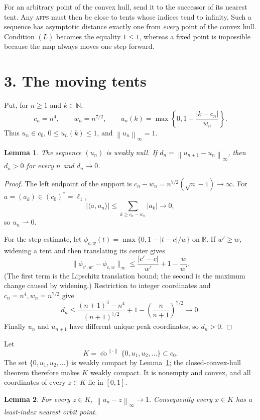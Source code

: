 \documentclass[10pt]{article}
\newtheorem{lemma}{Lemma}
\newcommand{\N}{\mathbb N}
\newcommand{\R}{\mathbb R}
\newcommand{\norm}[1]{\left\lVert #1\right\rVert_\infty}
\newcommand{\co}{\operatorname{co}}
\newcommand{\afps}{\textnormal{\textsc{afps}}\xspace}
\begin{document}
For an arbitrary point of the convex hull, send it to the successor of its
nearest tent.  Any \afps must then be close to tents whose indices tend to
infinity.  Such a sequence has asymptotic distance exactly one from
\emph{every} point of the convex hull.  Condition $(L)$ becomes the equality
$1\leq1$, whereas a fixed point is impossible because the map always moves
one step forward.

\section*{3. The moving tents}

Put, for $n\geq1$ and $k\in\N$,
\[
 c_n=n^4,\qquad w_n=n^{7/2},\qquad
 u_n(k)=\max\left\{0,1-\frac{|k-c_n|}{w_n}\right\}.
\]
Thus $u_n\in c_0$, $0\leq u_n(k)\leq1$, and $\norm{u_n}=1$.

\begin{lemma}\label{lem:orbit}
The sequence $(u_n)$ is weakly null.  If
$d_n=\norm{u_{n+1}-u_n}$, then $d_n>0$ for every $n$ and $d_n\to0$.
\end{lemma}

\begin{proof}
The left endpoint of the support is
$c_n-w_n=n^{7/2}(\sqrt n-1)\to\infty$.  For
$a=(a_k)\in(c_0)^*=\ell_1$,
\[
 |\langle a,u_n\rangle|
 \leq\sum_{k\geq c_n-w_n}|a_k|\longrightarrow0,
\]
so $u_n\rightharpoonup0$.

For the step estimate, let
$\phi_{c,w}(t)=\max\{0,1-|t-c|/w\}$ on $\R$.  If $w'\geq w$, widening a
tent and then translating its center gives
\[
 \|\phi_{c',w'}-\phi_{c,w}\|_\infty
 \leq \frac{|c'-c|}{w'}+1-\frac{w}{w'}.
\]
(The first term is the Lipschitz translation bound; the second is the
maximum change caused by widening.)  Restriction to integer coordinates and
$c_n=n^4,w_n=n^{7/2}$ give
\[
 d_n\leq
 \frac{(n+1)^4-n^4}{(n+1)^{7/2}}
 +1-\left(\frac n{n+1}\right)^{7/2}\longrightarrow0.
\]
Finally $u_n$ and $u_{n+1}$ have different unique peak coordinates, so
$d_n>0$.
\end{proof}

Let
\[
 K=\overline{\co}^{\|\cdot\|}\{0,u_1,u_2,\ldots\}\subset c_0.
\]
The set $\{0,u_1,u_2,\ldots\}$ is weakly compact by Lemma~\ref{lem:orbit};
the closed-convex-hull theorem therefore makes $K$ weakly compact.  It is
nonempty and convex, and all coordinates of every $z\in K$ lie in $[0,1]$.

\begin{lemma}\label{lem:distance}
For every $z\in K$, $\norm{u_n-z}\to1$.  Consequently every $x\in K$ has a
least-index nearest orbit point.
\end{lemma}
\end{document}
